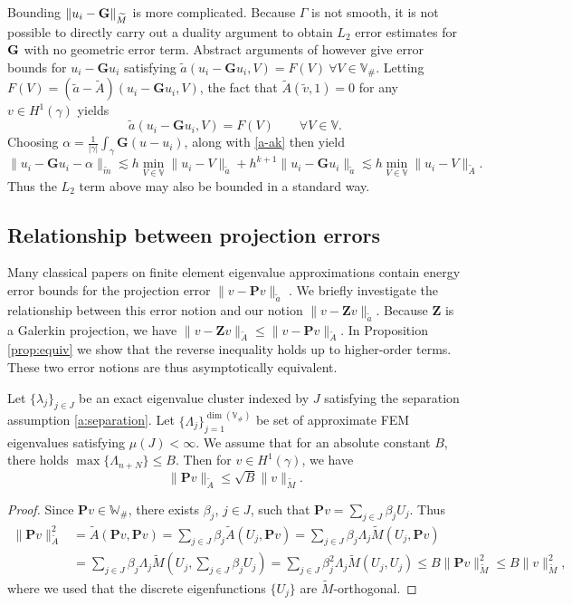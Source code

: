 \documentclass{siamart0516}
\newcommand{\bG}{\ensuremath{\boldsymbol G}}
\newcommand{\bP}{\ensuremath{\boldsymbol P}}
\newcommand{\bZ}{\ensuremath{\boldsymbol Z}}
\numberwithin{equation}{section}
\numberwithin{theorem}{section}
\numberwithin{figure}{section}
\begin{document}
Bounding $\|u_i-{\bf G}\|_{\widetilde M}$ is more complicated.  Because $\Gamma$ is not smooth, it is not possible to directly carry out a duality argument to obtain $L_2$ error estimates for ${\bf G}$ with no geometric error term.  Abstract arguments of \cite{D09} however give error bounds for $u_i-{\bG} u_i$ satisfying $\tilde a(u_i-{\bG}u_i, V) =F(V) ~ \forall V \in \mathbb V_\#$.  Letting  $F(V)= (\tilde a-\widetilde A)(u_i-{\bG} u_i, V)$, the fact that $\widetilde A(\tilde v,1)=0$ for any $v \in H^1(\gamma)$ yields $$
\tilde a(u_i-{\bG}u_i, V) =F(V)\qquad \forall V \in \mathbb V.
$$
Choosing $\alpha= \frac{1}{|\gamma|} \int_\gamma {\bG} (u-u_i)$,  \cite[Theorem 3.1]{D09} along with \eqref{a-ak}   then yield
$$
\|u_i-{\bG} u_i- \alpha \|_{\tilde m}  \lesssim h \min_{V \in \mathbb{V}} \|u_i-V\|_{\tilde a} + h^{k+1} \|u_i -{\bG} u_i\|_{\tilde a}
  \lesssim  h \min_{V \in \mathbb{V}} \|u_i-V\|_{\widetilde A}.
$$
Thus the $L_2$ term above may also be bounded in a standard way.  


\subsection{Relationship between projection errors}  Many classical papers on finite element eigenvalue approximations contain energy error bounds for the projection error $\|v-\bP v\|_{\tilde a}$  \cite{BO89, BO91}.  We briefly investigate the relationship between this error notion and our notion $\|v-\bZ v\|_{\tilde a}$.  Because ${\bZ}$ is a Galerkin projection, we have $\|v-{\bZ} v\|_{\widetilde A} \le \|v-\bP v\|_{\widetilde A}$.  In Proposition \ref{prop:equiv} we show that the reverse inequality holds up to higher-order terms.  These two error notions are thus asymptotically equivalent.  
\begin{lemma}\label{Plesssimon}
Let $\{\lambda_j\}_{j\in J}$ be an exact eigenvalue cluster indexed by $J$  satisfying the separation assumption \eqref{a:separation}. Let $\{\Lambda_{j}\}_{j=1}^{\dim (\mathbb{V}_\#)}$ be set of approximate FEM eigenvalues satisfying $\mu(J)<\infty$.
We assume that for an absolute constant $B$, there holds $\max\{\Lambda_{n+N}\} \le B.$
Then for $v \in H^1(\gamma)$, we have
$$
\|\bP v\|_{\widetilde A} \le \sqrt{B} \| v\|_{\widetilde M}.
$$
\end{lemma}
\begin{proof}
Since $\bP v \in \mathbb W_\#$, there exists $\beta_j$, $j\in J$, such that
$\bP v=  \sum_{j \in J}\beta_j U_{j}.$
Thus
\begin{align*}
\|\bP v\|_{\widetilde A}^2  & = \widetilde A(\bP v, \bP v) = \sum_{j \in J} \beta_j \widetilde A(U_{j},\bP v) = \sum_{j\in J}\beta_j \Lambda_{j}\widetilde M(U_{j},\bP v)
\\ 
& =\sum_{j \in J}\beta_j \Lambda_{j}\widetilde M(U_{j},\sum_{j\in J}\beta_j U_{j}) = \sum_{j\in J}\beta_j^2 \Lambda_{j} \widetilde M(U_j,U_j) \leq B \|\bP v\|_{\widetilde M}^2 \le B\|v\|_{\widetilde M}^2,
\end{align*}
where we used that the discrete eigenfunctions $\{ U_j \}$ are $\widetilde M$-orthogonal.
\end{proof}
\end{document}
